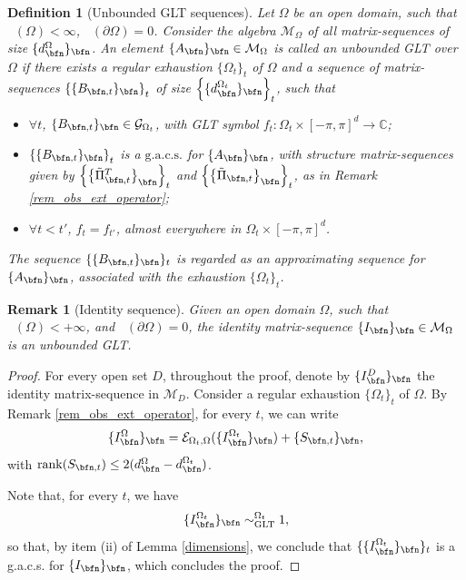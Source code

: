 \documentclass{amsart}
\newtheorem{defn}[thm]{Definition}
\newtheorem{rem}[thm]{Remark}
\DeclareMathOperator{\Ld}{\mathcal{L}^d}
\begin{document}
\begin{defn}[Unbounded GLT sequences]\label{def_UGLT}
    Let $\Omega$ be an open domain, such that $\Ld(\Omega)<\infty$, $\Ld(\partial\Omega)=0$.
    Consider the algebra $\mathcal{M}_{\Omega}$ of all matrix-sequences of size $\{d_\bfn^{\Omega}\}_\bfn$. An element $\{A_\bfn\}_\bfn\in\mathcal{M}_\Omega$ is called an unbounded GLT over $\Omega$ if there exists a regular exhaustion $\{\Omega_t\}_t$ of $\Omega$ and a sequence of matrix-sequences $\left\{\{B_{\bfn,t}\}_\bfn\right\}_t$ of size $\left\{\{d_\bfn^{\Omega_t}\}_\bfn\right\}_t$, such that
    \begin{itemize}
        \item[(i)] $\forall t$, $\{B_{\bfn,t}\}_\bfn\in\mathcal{G}_{\Omega_t}$, with GLT symbol $f_t:\Omega_t\times[-\pi,\pi]^d\to\mathbb{C}$;
        \item[(ii)] $\left\{\{B_{\bfn,t}\}_\bfn\right\}_t$ is a $\mathrm{g.a.c.s.}$ for $\{A_\bfn\}_\bfn$, with structure matrix-sequences given by $\left\{\left\{\tilde{\Pi}^{T}_{\bfn,t}\right\}_\bfn\right\}_t$ and $\left\{\left\{\tilde{\Pi}_{\bfn,t}\right\}_\bfn\right\}_t$, as in Remark \ref{rem_obs_ext_operator};
        \item[(iii)] $\forall t<t'$, $f_t=f_{t'}$, almost everywhere in  $\Omega_t\times[-\pi,\pi]^d$.
    \end{itemize}
    The sequence $\{\{B_{\bfn,t}\}_\bfn\}_t$ is regarded as an approximating sequence for $\{A_\bfn\}_\bfn$, associated with the exhaustion $\{\Omega_t\}_t$.
\end{defn}
\begin{rem}[Identity sequence]
    Given an open domain $\Omega$, such that $\Ld(\Omega)<+\infty$, and $\Ld(\partial\Omega)=0$, the identity matrix-sequence $\{I_\bfn\}_\bfn\in\mathcal{M}_\Omega$ is an unbounded GLT.  
\end{rem}
\begin{proof}
    For every open set $D$, throughout the proof, denote by $\{I_\bfn^{D}\}_\bfn$ the identity matrix-sequence in $\mathcal{M}_D$. 
    Consider a regular exhaustion $\{\Omega_t\}_t$ of $\Omega$. By Remark \ref{rem_obs_ext_operator}, for every $t$, we can write
    \begin{equation*}
        \{I_\bfn^{\Omega}\}_\bfn=\mathcal{E}_{\Omega_t,\Omega}(\{I_\bfn^{\Omega_t}\}_\bfn)+\{S_{\bfn,t}\}_\bfn,
    \end{equation*}
    with $\mathrm{rank}(S_{\bfn,t})\leq 2(d_\bfn^{\Omega}-d_\bfn^{\Omega_t})$. 
    
    Note that, for every $t$, we have
    \begin{equation*}
        \{I_\bfn^{\Omega_t}\}_\bfn\sim_{\mathrm{GLT}}^{\Omega_t}1,
    \end{equation*}
    so that, by item (ii) of Lemma \ref{dimensions}, we conclude that $\{\{I_\bfn^{\Omega_t}\}_\bfn\}_t$ is a g.a.c.s. for $\{I_\bfn\}_\bfn$, which concludes the proof.
\end{proof}
\end{document}
